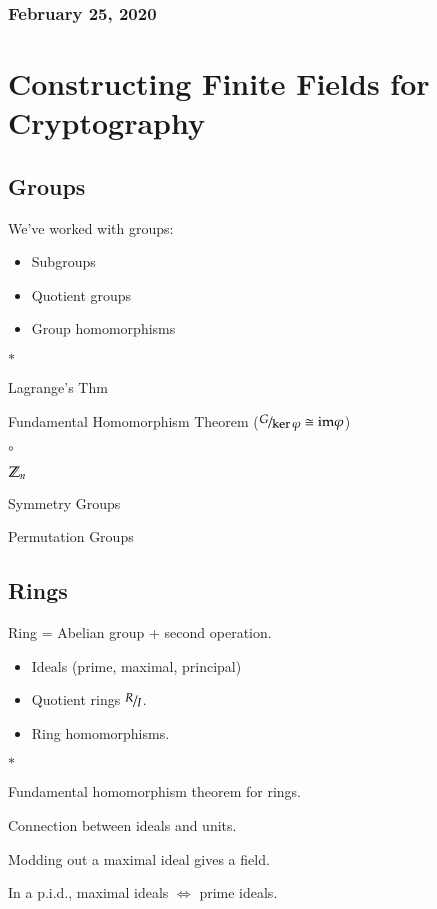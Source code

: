\subsubsection*{February 25, 2020}
\section{Constructing Finite Fields for Cryptography}
\subsection{Groups}
We've worked with groups: 
\begin{itemize}
	\item Subgroups
	\item Quotient groups
	\item Group homomorphisms
\end{itemize}
\begin{list}{$*$}{}  
	\item Lagrange's Thm
	\item Fundamental Homomorphism Theorem ($\nicefrac{G}{\ker \varphi}\cong \mathrm{im} \varphi$)
\end{list}
\begin{list}{$\circ$}{}  
	\item $\mathbb{Z}_n$
	\item Symmetry Groups
	\item Permutation Groups 
\end{list}

\subsection{Rings}
Ring = Abelian group + second operation.
\begin{itemize}
	\item Ideals (prime, maximal, principal)
	\item Quotient rings $\nicefrac{R}{I}$. 
	\item Ring homomorphisms. 
\end{itemize}
\begin{list}{$*$}{}  
	\item Fundamental homomorphism theorem for rings. 
	\item Connection between ideals and units. 
	\item Modding out a maximal ideal gives a field. 
	\item In a p.i.d., maximal ideals $\iff$ prime ideals. 
\end{list}

